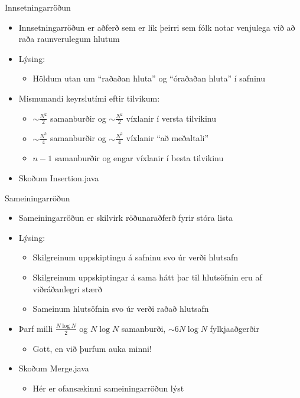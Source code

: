 \documentclass[handout]{beamer}
\begin{document}
\begin{frame}{Innsetningarröðun}
\begin{itemize}
 \item Innsetningarröðun  er aðferð sem er lík þeirri sem fólk notar venjulega við að raða raunverulegum hlutum
 \item Lýsing:
 \begin{itemize}
  \item Höldum utan um ``raðaðan hluta'' og ``óraðaðan hluta'' í safninu
 \end{itemize}
 \item Mismunandi keyrslutími eftir tilvikum:
 \begin{itemize}
  \item $\sim \frac{N^2}{2}$ samanburðir og $\sim \frac{N^2}{2}$ víxlanir í versta tilvikinu
  \item $\sim \frac{N^2}{4}$ samanburðir og $\sim \frac{N^2}{4}$ víxlanir ``að meðaltali''
  \item $n-1$ samanburðir og engar víxlanir í besta tilvikinu 
 \end{itemize}
 \item Skoðum Insertion.java
\end{itemize}
\end{frame}

\begin{frame}{Sameiningarröðun}
\begin{itemize}
 \item Sameiningarröðun  er skilvirk röðunaraðferð fyrir stóra lista
 \item Lýsing:
 \begin{itemize}
  \item Skilgreinum uppskiptingu á safninu svo úr verði hlutsafn
  \item Skilgreinum uppskiptingar á sama hátt þar til hlutsöfnin eru af viðráðanlegri stærð
  \item Sameinum hlutsöfnin svo úr verði raðað hlutsafn
 \end{itemize}
 \item Þarf milli $\frac{N \log N}{2}$ og $N \log N$ samanburði, $\sim 6N\log N$ fylkjaaðgerðir
 \begin{itemize}
  \item Gott, en við þurfum auka minni!
 \end{itemize}
 \item Skoðum Merge.java
 \begin{itemize}
  \item Hér er ofansækinni  sameiningarröðun lýst
 \end{itemize}
\end{itemize}
\end{frame}
\end{document}

